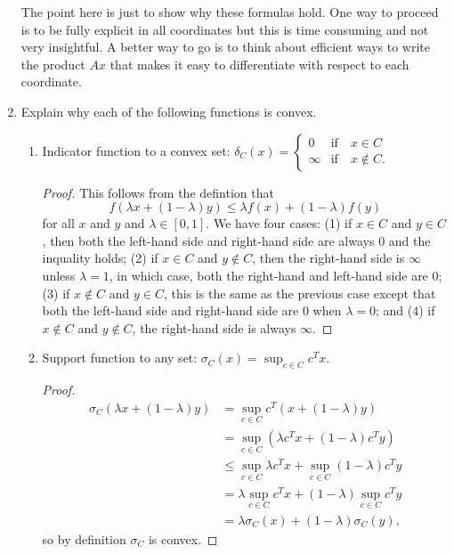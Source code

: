 \documentclass[11pt]{amsart}
\begin{document}
\begin{enumerate}
The point here is just to show why these formulas hold. One way to proceed is to be fully explicit in all coordinates but this is time consuming and not very insightful. A better way to go is to think about efficient ways to write the 
product $Ax$ that makes it easy to differentiate with respect to each coordinate. 


\bigskip\bigskip


\item Explain why each of the following functions is convex. 

\begin{enumerate}
\item Indicator function to a convex set: 
\(
\delta_C(x) = \begin{cases} 0 & \mbox{if} \quad x \in C \\ \infty & \mbox{if} \quad x \not \in C. \end{cases}
\)

\begin{proof}
  This follows from the defintion that
  $$f(\lambda x + (1-\lambda)y) \leq \lambda f(x) + (1 - \lambda)f(y)$$ for all
  $x$ and $y$ and $\lambda \in [0, 1]$. We have four cases: (1) if $x \in C$ and
  $y \in C$, then both the left-hand side and right-hand side are always $0$ and
  the inquality holds; (2) if $x \in C$ and $y \not\in C$, then the right-hand
  side is $\infty$ unless $\lambda = 1$, in which case, both the right-hand and
  left-hand side are $0$; (3) if $x \not\in C$ and $y \in C$, this is the same
  as the previous case except that both the left-hand side and right-hand side
  are $0$ when $\lambda = 0$; and (4) if $x \not\in C$ and $y \not\in C$, the
  right-hand side is always $\infty$.
\end{proof}

\item Support function to any set: 
\(
\sigma_C(x) = \sup_{c \in C} c^Tx.
\)

\begin{proof}
  \begin{align*}
    \sigma_C(\lambda x + (1-\lambda)y)
    &= \sup_{c \in C} c^T\left(x + (1-\lambda)y\right) \\
    &= \sup_{c \in C} \left(\lambda c^T x + (1-\lambda)c^Ty\right) \\
    &\leq \sup_{c \in C} \lambda c^T x + \sup_{c \in C}  (1-\lambda)c^Ty \\
    &= \lambda \sup_{c \in C}  c^T x + (1-\lambda)\sup_{c \in C} c^Ty \\
    &= \lambda \sigma_C(x) + (1-\lambda)\sigma_C(y),
  \end{align*}
  so by definition $\sigma_C$ is convex.
\end{proof}


\end{enumerate}
\end{enumerate}
\end{document}
